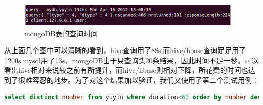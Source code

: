 \begin{description}
\item
\begin{figure}[!ht]
\centering
\includegraphics[scale=1.2]{photo/djm2.png} 
\caption{mongoDB表的查询时间}
\end{figure} 

\end{description}

从上面几个图中可以清晰的看到，hive查询用了88s,而hive/hbase查询足足用了1200s,mysql用了13s，mongoDB由于只查询头20条结果，因此时间不足一秒。可以看出hive相对来说较之前有所提升，而hive/hbase则相对下降，所花费的时间也达到了很难容忍的地步。为了对这个结果加以验证，我们又使用了第二个测试用例：
\begin{lstlisting}[language=SQL]
select distinct number from yuyin where duration<60 order by number desc;
\end{lstlisting}

